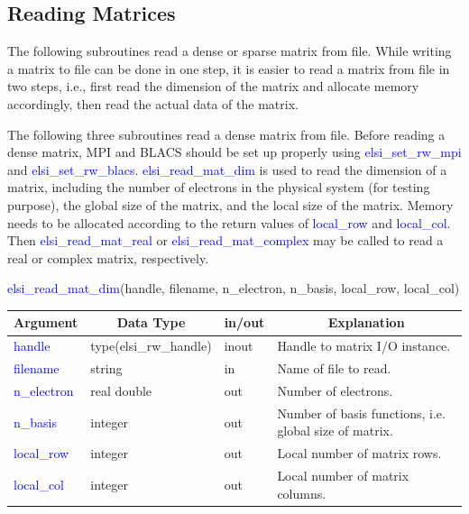 \documentclass{report}
\begin{document}
\subsection{Reading Matrices}
\label{subsec:rw_read}
The following subroutines read a dense or sparse matrix from file.  While writing a matrix to file can be done in one step, it is easier to read a matrix from file in two steps, i.e., first read the dimension of the matrix and allocate memory accordingly, then read the actual data of the matrix.

The following three subroutines read a dense matrix from file.  Before reading a dense matrix, MPI and BLACS should be set up properly using \textcolor{blue}{elsi\_set\_rw\_mpi} and \textcolor{blue}{elsi\_set\_rw\_blacs}.  \textcolor{blue}{elsi\_read\_mat\_dim} is used to read the dimension of a matrix, including the number of electrons in the physical system (for testing purpose), the global size of the matrix, and the local size of the matrix.  Memory needs to be allocated according to the return values of \textcolor{blue}{local\_row} and \textcolor{blue}{local\_col}.  Then \textcolor{blue}{elsi\_read\_mat\_real} or \textcolor{blue}{elsi\_read\_mat\_complex} may be called to read a real or complex matrix, respectively.
\begin{labeling}{\hspace{6cm}}
\item [\hspace{0.3cm} \textcolor{blue}{elsi\_read\_mat\_dim}(handle, filename, n\_electron, n\_basis, local\_row, local\_col)]
\end{labeling}

\begin{tabular}[]{|p{20mm}|p{45mm}|p{15mm}|p{85mm}|}
\hline
\multicolumn{1}{|c|}{\textbf{Argument}} & \multicolumn{1}{c|}{\textbf{Data Type}} & \multicolumn{1}{c|}{\textbf{in/out}} & \multicolumn{1}{c|}{\textbf{Explanation}}\\
\hline
\textcolor{blue}{handle}      & type(elsi\_rw\_handle) & inout & Handle to matrix I/O instance.\\
\hline
\textcolor{blue}{filename}    & string                 & in    & Name of file to read.\\
\hline
\textcolor{blue}{n\_electron} & real double            & out   & Number of electrons.\\
\hline
\textcolor{blue}{n\_basis}    & integer                & out   & Number of basis functions, i.e. global size of matrix.\\
\hline
\textcolor{blue}{local\_row}  & integer                & out   & Local number of matrix rows.\\
\hline
\textcolor{blue}{local\_col}  & integer                & out   & Local number of matrix columns.\\
\hline
\end{tabular}
\end{document}
